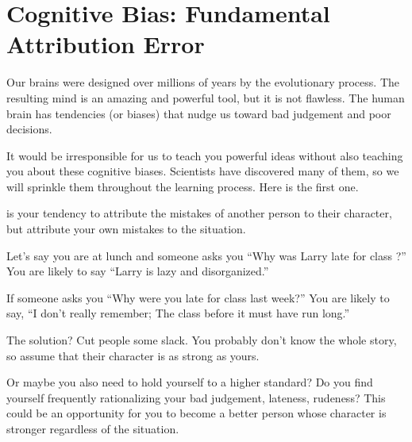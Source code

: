 \section{Cognitive Bias: Fundamental Attribution Error}

Our brains were designed over millions of years by the evolutionary
process. The resulting mind is an amazing and powerful tool, but it is
not flawless. The human brain has tendencies (or biases) that nudge us
toward bad judgement and poor decisions.

It would be irresponsible for us to teach you powerful ideas without
also teaching you about these cognitive biases. Scientists have
discovered many of them, so we will sprinkle them throughout the
learning process. Here is the first one.

 is your tendency to attribute
the mistakes of another person to their character, but attribute your
own mistakes to the situation.

Let's say you are at lunch and someone asks you ``Why was Larry late
for class ?''  You are likely to say ``Larry is lazy
and disorganized.''

If someone asks you ``Why were you late for class last week?''  You
are likely to say, ``I don't really remember; The class before it must have
run long.''

The solution? Cut people some slack. You probably don't know the whole
story, so assume that their character is as strong as yours.

Or maybe you also need to hold yourself to a higher standard? Do you find
yourself frequently rationalizing your bad judgement, lateness,
rudeness?  This could be an opportunity for you to become a better
person whose character is stronger regardless of the situation.
